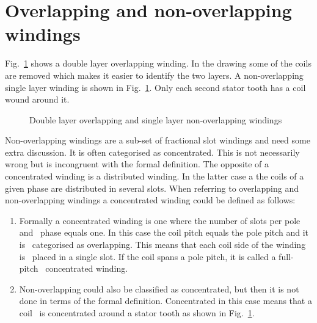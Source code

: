 \section{Overlapping and non-overlapping windings}\label{sec:def_con}  
Fig.~\ref{fig:flux_coils} shows a double layer overlapping winding. In the drawing some of the coils are removed which makes it easier to identify the two layers. A non-overlapping single layer winding is shown in Fig.~\ref{fig:flux_coils}. Only each second stator tooth has a coil wound around it. 
\begin{figure}[htbp]
  \fontsize{6}{8}\selectfont
  \centering
  \hfill
  \caption{Double layer overlapping and single layer non-overlapping windings}
  \label{fig:flux_coils}
\end{figure}

Non-overlapping windings are a sub-set of fractional slot windings and need some extra discussion. It is often categorised as concentrated. This is not necessarily wrong but is incongruent with the formal definition. The opposite of a concentrated winding is a distributed winding. In the latter case a the coils of a given phase are distributed in several slots. When referring to overlapping and non-overlapping windings a concentrated winding could be defined as follows:
\begin{enumerate}
  \item Formally a concentrated winding is one where the number of slots per pole and~%
  phase equals one. In this case the coil pitch equals the pole pitch and it is~%
  categorised as overlapping. This means that each coil side of the winding is~%
  placed in a single slot. If the coil spans a pole pitch, it is called a full-pitch~%
  concentrated winding.
  \item Non-overlapping could also be classified as concentrated, but then it is not~%
  done in terms of the formal definition. Concentrated in this case means that a coil~%
  is concentrated around a stator tooth as shown in Fig.~\ref{fig:flux_coils}.
\end{enumerate}

